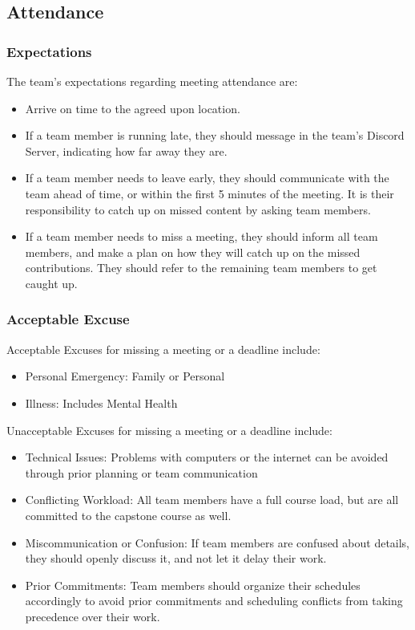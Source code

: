 \documentclass{article}
\begin{document}
\subsection*{Attendance}

\subsubsection*{Expectations}

\indent The team's expectations regarding meeting attendance are:
\begin{itemize}
  \item Arrive on time to the agreed upon location.
  \item If a team member is running late, they should message in the team's Discord Server, indicating how far away they are.
  \item If a team member needs to leave early, they should communicate with the team ahead of time, or within the first 5 minutes of the meeting. It is their responsibility to catch up on missed content by asking team members.
  \item If a team member needs to miss a meeting, they should inform all team members, and make a plan on how they will catch up on the missed contributions. They should refer to the remaining team members to get caught up.
\end{itemize}

\subsubsection*{Acceptable Excuse}

Acceptable Excuses for missing a meeting or a deadline include:
\begin{itemize}
  \item Personal Emergency: Family or Personal
  \item Illness: Includes Mental Health
\end{itemize}

Unacceptable Excuses for missing a meeting or a deadline include:
\begin{itemize}
  \item Technical Issues: Problems with computers or the internet can be avoided through prior planning or team communication
  \item Conflicting Workload: All team members have a full course load, but are all committed to the capstone course as well.
  \item Miscommunication or Confusion: If team members are confused about details, they should openly discuss it, and not let it delay their work.
  \item Prior Commitments: Team members should organize their schedules accordingly to avoid prior commitments and scheduling conflicts from taking precedence over their work.
\end{itemize}
\end{document}
